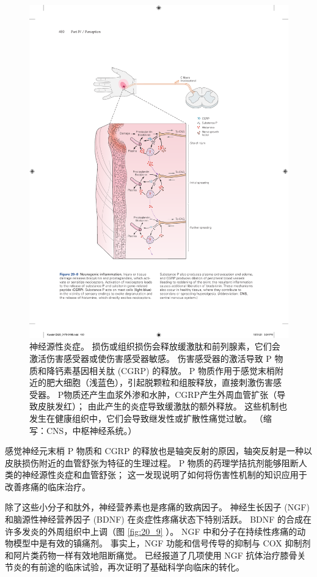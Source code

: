 \begin{figure}[htbp]
	\centering
	\includegraphics[width=0.7\linewidth]{chap20/fig_20_8}
	\caption{神经源性炎症。 
		损伤或组织损伤会释放缓激肽和前列腺素，它们会激活伤害感受器或使伤害感受器敏感。 
		伤害感受器的激活导致 P 物质和降钙素基因相关肽 (CGRP) 的释放。 
		P 物质作用于感觉末梢附近的肥大细胞（浅蓝色），引起脱颗粒和组胺释放，直接刺激伤害感受器。 
		P物质还产生血浆外渗和水肿，CGRP产生外周血管扩张（导致皮肤发红）； 由此产生的炎症导致缓激肽的额外释放。 
		这些机制也发生在健康组织中，它们会导致继发性或扩散性痛觉过敏。 （缩写：CNS，中枢神经系统。）}
	\label{fig:20_8}
\end{figure}

感觉神经元末梢 P 物质和 CGRP 的释放也是轴突反射的原因，轴突反射是一种以皮肤损伤附近的血管舒张为特征的生理过程。 
P 物质的药理学拮抗剂能够阻断人类的神经源性炎症和血管舒张； 这一发现说明了如何将伤害性机制的知识应用于改善疼痛的临床治疗。


除了这些小分子和肽外，神经营养素也是疼痛的致病因子。 
神经生长因子 (NGF) 和脑源性神经营养因子 (BDNF) 在炎症性疼痛状态下特别活跃。 
BDNF 的合成在许多发炎的外周组织中上调（图 \ref{fig:20_9} ）。 
NGF 中和分子在持续性疼痛的动物模型中是有效的镇痛剂。 
事实上，NGF 功能和信号传导的抑制与 COX 抑制剂和阿片类药物一样有效地阻断痛觉。 
已经报道了几项使用 NGF 抗体治疗膝骨关节炎的有前途的临床试验，再次证明了基础科学向临床的转化。


